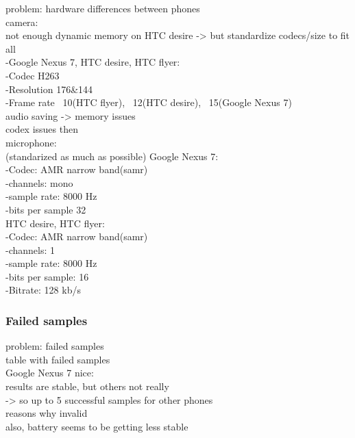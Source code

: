 problem: hardware differences between phones\\
	camera:\\
		not enough dynamic memory on HTC desire -> but standardize codecs/size to fit all\\
		-Google Nexus 7, HTC desire, HTC flyer:\\
					-Codec H263\\
					-Resolution	176\&144\\
					-Frame rate		~10(HTC flyer),	~12(HTC desire),	~15(Google Nexus 7)\\
		audio saving -> memory issues\\
			codex issues then\\
	microphone:\\
		(standarized as much as possible)
		Google Nexus 7:\\
			-Codec: AMR narrow band(samr)\\
			-channels: 		mono\\
			-sample rate:	8000 Hz\\
			-bits per sample 	32\\
		HTC desire, HTC flyer:\\
			-Codec: AMR narrow band(samr)\\
			-channels:		1\\
			-sample rate:	8000 Hz\\
			-bits per sample:	16\\
			-Bitrate:		128 kb/s	\\
			
\subsubsection{Failed samples}
problem: failed samples\\
	table with failed samples\\
	Google Nexus 7 nice:\\
		results are stable, but others not really\\
			-> so up to 5 successful samples for other phones\\
	reasons why invalid\\
	
	also, battery seems to be getting less stable
	
